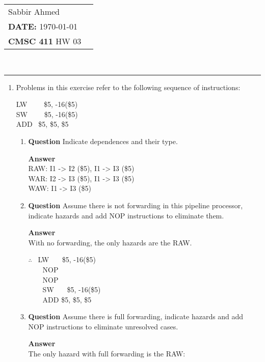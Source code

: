 \documentclass[paper=usletter, fontsize=12pt]{article}
\newcommand{\documentinfo}[5]{
    \begin{centering}
        \parbox{2in}{
        \begin{spacing}{1}
            \begin{flushleft}
                \begin{tabular}{l l}
                    #1 \\
                    #2 \\
                    #3 \\
                \end{tabular}\\
                \rule{\textwidth}{1pt}
            \end{flushleft}
        \end{spacing}
        }
    \end{centering}
}
\begin{document}
    \documentinfo{Sabbir Ahmed}{\textbf{DATE:} \today}{\textbf{CMSC 411} HW 03}
    \vspace{-0.3in}

    \begin{enumerate}

        \item
        Problems in this exercise refer to the following sequence of instructions:

        LW  \ \ \ \   \$5, -16(\$5) \\
        SW  \ \ \ \   \$5, -16(\$5) \\
        ADD \         \$5, \$5, \$5 \\

        \begin{enumerate}

            \item \textbf{Question}
            Indicate dependences and their type.

            \textbf{Answer} \\
            RAW: I1 -> I2 (\$5), I1 -> I3 (\$5) \\
            WAR: I2 -> I3 (\$5), I1 -> I3 (\$5) \\
            WAW: I1 -> I3 (\$5) \\

            \item \textbf{Question}
            Assume there is not forwarding in this pipeline processor, indicate hazards and add NOP instructions to eliminate them.

            \textbf{Answer} \\
            With no forwarding, the only hazards are the RAW.

            $\therefore$ \nolinebreak
                \ LW \ \ \ \$5, -16(\$5) \\
                \indent  \ \ \ \  NOP \\
                \indent  \ \ \ \  NOP \\
                \indent  \ \ \ \  SW \ \ \ \$5, -16(\$5) \\
                \indent  \ \ \ \ ADD \$5, \$5, \$5 \\

            \item \textbf{Question}
            Assume there is full forwarding, indicate hazards and add NOP instructions to eliminate unresolved cases.

            \textbf{Answer} \\
            The only hazard with full forwarding is the RAW: \\


\end{enumerate}
\end{enumerate}
\end{document}
